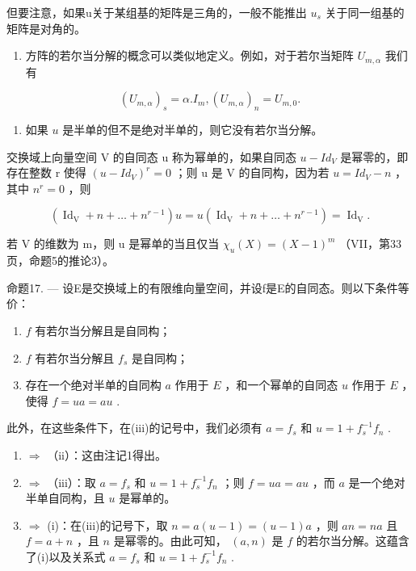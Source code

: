 但要注意，如果u关于某组基的矩阵是三角的，一般不能推出 \(u_{s}\) 关于同一组基的矩阵是对角的。

\begin{enumerate}
\def\labelenumi{\arabic{enumi})}
\setcounter{enumi}{2}
\tightlist
\item
  方阵的若尔当分解的概念可以类似地定义。例如，对于若尔当矩阵 \(U_{m,\alpha}\) 我们有
\end{enumerate}

\[
(U _ {m, \alpha}) _ {s} = \alpha . I _ {m}, (U _ {m, \alpha}) _ {n} = U _ {m, 0}.
\]

\begin{enumerate}
\def\labelenumi{\arabic{enumi})}
\setcounter{enumi}{3}
\tightlist
\item
  如果 \(u\) 是半单的但不是绝对半单的，则它没有若尔当分解。
\end{enumerate}

交换域上向量空间 V 的自同态 u 称为幂单的，如果自同态 \(u - Id_{V}\) 是幂零的，即存在整数 r 使得 \((u - Id_{V})^{r} = 0\) ；则 u 是 V 的自同构，因为若 \(u = Id_{V} - n\) ，其中 \(n^{r} = 0\) ，则

\[
\left(\operatorname{Id} _ {\mathrm{V}} + n + \dots + n ^ {r - 1}\right) u = u \left(\operatorname{Id} _ {\mathrm{V}} + n + \dots + n ^ {r - 1}\right) = \operatorname{Id} _ {\mathrm{V}}.
\]

若 V 的维数为 m，则 u 是幂单的当且仅当 \(\chi_{u}(X)=(X-1)^{m}\) （VII，第33页，命题5的推论3）。

命题17. --- 设E是交换域上的有限维向量空间，并设f是E的自同态。则以下条件等价：

\begin{enumerate}
\def\labelenumi{(\roman{enumi})}
\item
  \(f\) 有若尔当分解且是自同构；
\item
  \(f\) 有若尔当分解且 \(f_{s}\) 是自同构；
\item
  存在一个绝对半单的自同构 \(a\) 作用于 \(E\) ，和一个幂单的自同态 \(u\) 作用于 \(E\) ，使得 \(f = ua = au\) .
\end{enumerate}

此外，在这些条件下，在(iii)的记号中，我们必须有 \(a = f_{s}\) 和 \(u = 1 + f_{s}^{-1}f_{n}\) .

\begin{enumerate}
\def\labelenumi{(\roman{enumi})}
\item
  \(\Rightarrow\) （ii）：这由注记1得出。
\item
  \(\Rightarrow\) （iii）：取 \(a = f_{s}\) 和 \(u = 1 + f_{s}^{-1}f_{n}\) ；则 \(f = ua = au\) ，而 \(a\) 是一个绝对半单自同构，且 \(u\) 是幂单的。
\item
  \(\Rightarrow\) (i)：在(iii)的记号下，取 \(n = a(u - 1) = (u - 1)a\) ，则 \(an = na\) 且 \(f = a + n\) ，且 \(n\) 是幂零的。由此可知， \((a, n)\) 是 \(f\) 的若尔当分解。这蕴含了(i)以及关系式 \(a = f_s\) 和 \(u = 1 + f_s^{-1}f_n\) .
\end{enumerate}

